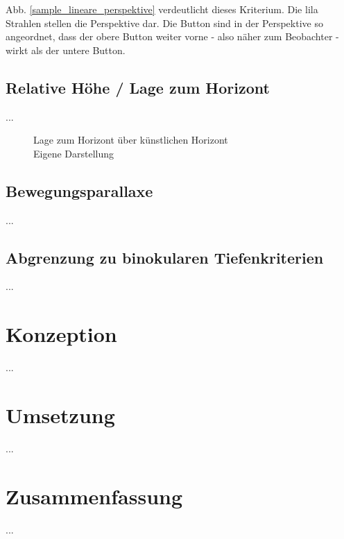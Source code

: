 Abb. \ref{sample_lineare_perspektive} verdeutlicht dieses Kriterium. Die lila Strahlen stellen die Perspektive dar. Die Button sind in der Perspektive so angeordnet, dass der obere Button weiter vorne - also näher zum Beobachter - wirkt als der untere Button.

\subsection{Relative Höhe / Lage zum Horizont}
...

\begin{figure}[!ht]
\centering
{}
\caption[Lage zum Horizont über künstlichen Horizont]{Lage zum Horizont über künstlichen Horizont\\ Eigene Darstellung}
\label{sample_lage_zum_horizont}
\end{figure}

\subsection{Bewegungsparallaxe}
...

\subsection{Abgrenzung zu binokularen Tiefenkriterien}
...

\section{Konzeption}
...

\section{Umsetzung}
...

\section{Zusammenfassung}
...